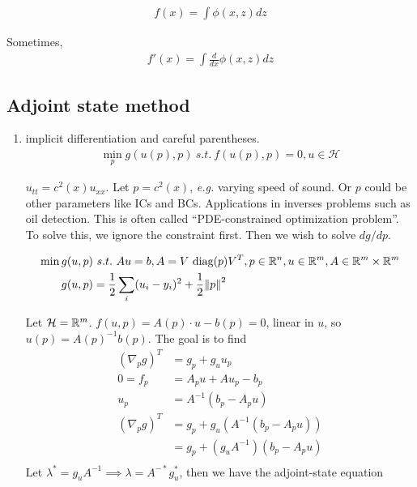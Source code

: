 \documentclass[class=article,crop=false]{standalone}
\begin{document}
\begin{align*}
	f(x) = \int \phi(x,z) dz
\end{align*}
\begin{thm}
Sometimes,
\begin{align*}
	f'(x) = \int \frac{d}{dx} \phi(x,z) dz 
\end{align*}
\end{thm}
\subsection{Adjoint state method}
\begin{enumerate}[label=(\arabic*)]
	\item implicit differentiation and careful parentheses.
		\begin{align*}
			\min_{p} g(u(p),p)\ s.t.\ f(u(p),p) = 0, u \in \mathcal{ H}
		\end{align*}
		\begin{eg}
			$ u_{tt} = c^2(x) u_{x x}$. Let $p= c^2(x)$, \emph{e.g.} varying speed of sound. Or $ p$ could be other parameters like ICs and BCs. Applications in inverses problems such as oil detection. This is often called ``PDE-constrained optimization problem''.
			To solve this, we ignore the constraint first. Then we wish to solve $ dg /dp$.
		\end{eg}
		\begin{eg}
		\begin{align*}
			\min g(u,p) &\ s.t.\ A u = b, A= V \text{ diag}  (p) V^{T}, p \in \mathbb{R}^{n}, u \in \mathbb{R}^{m}, A \in \mathbb{R}^{m} \times \mathbb{R}^{m}\\
			g(u,p) &= \frac{1}{2} \sum_i (u_i - y_i)^2 + \frac{1}{2} {\left\lVert{ p}\right\rVert}^2 \\
		\end{align*}
		\end{eg}
		\begin{eg}
			Let $ \mathcal{ H} = \mathbb{R}^{m}$. $ f(u,p) = A(p) \cdot  u -b(p)=0$, linear in $ u$, so $ u(p) = A(p)^{-1} b(p)$. The goal is to find
			\begin{align*}
				(\nabla _p g)^{T} &= g_p + g_u u_p \\
				0=f_p &= A_p u + Au_p -b_p \\
				u_p &= A^{-1}(b_p - A_p u)\\
				(\nabla _p g)^{T} &= g_p + g_u (A^{-1}(b_p - A_p u))\\
						  &= g_p + (g_u A^{-1})(b_p - A_p u) \\
			\end{align*}
			Let $ \lambda^* = g_u A^{-1} \implies \lambda = A^{-*} g_u^* $, then we have the adjoint-state equation

\end{eg}
\end{enumerate}
\end{document}
